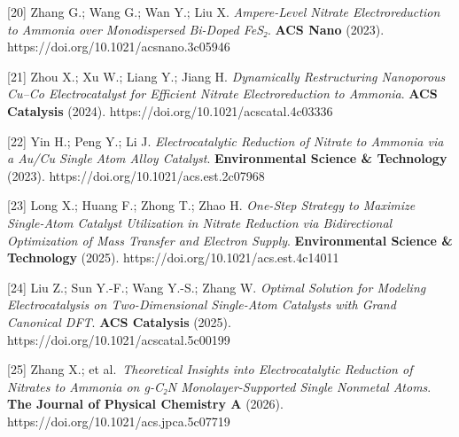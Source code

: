 \documentclass[
]{article}
\begin{document}
{[}20{]} Zhang G.; Wang G.; Wan Y.; Liu X. \emph{Ampere-Level Nitrate
Electroreduction to Ammonia over Monodispersed Bi-Doped FeS₂}.
\textbf{ACS Nano} (2023). https://doi.org/10.1021/acsnano.3c05946

{[}21{]} Zhou X.; Xu W.; Liang Y.; Jiang H. \emph{Dynamically
Restructuring Nanoporous Cu--Co Electrocatalyst for Efficient Nitrate
Electroreduction to Ammonia}. \textbf{ACS Catalysis} (2024).
https://doi.org/10.1021/acscatal.4c03336

{[}22{]} Yin H.; Peng Y.; Li J. \emph{Electrocatalytic Reduction of
Nitrate to Ammonia via a Au/Cu Single Atom Alloy Catalyst}.
\textbf{Environmental Science \& Technology} (2023).
https://doi.org/10.1021/acs.est.2c07968

{[}23{]} Long X.; Huang F.; Zhong T.; Zhao H. \emph{One-Step Strategy to
Maximize Single-Atom Catalyst Utilization in Nitrate Reduction via
Bidirectional Optimization of Mass Transfer and Electron Supply}.
\textbf{Environmental Science \& Technology} (2025).
https://doi.org/10.1021/acs.est.4c14011

{[}24{]} Liu Z.; Sun Y.-F.; Wang Y.-S.; Zhang W. \emph{Optimal Solution
for Modeling Electrocatalysis on Two-Dimensional Single-Atom Catalysts
with Grand Canonical DFT}. \textbf{ACS Catalysis} (2025).
https://doi.org/10.1021/acscatal.5c00199

{[}25{]} Zhang X.; et al.~\emph{Theoretical Insights into
Electrocatalytic Reduction of Nitrates to Ammonia on g-C₂N
Monolayer-Supported Single Nonmetal Atoms}. \textbf{The Journal of
Physical Chemistry A} (2026). https://doi.org/10.1021/acs.jpca.5c07719
\end{document}

